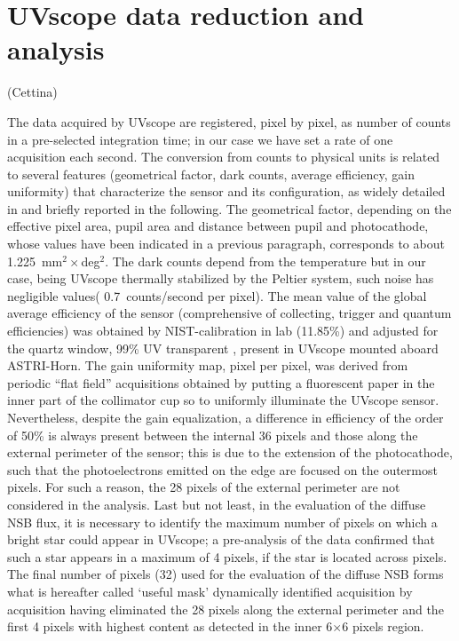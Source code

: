 \newpage
\section{UVscope data reduction and analysis} (Cettina)
\label{sect:uvscopedata}

The data acquired by UVscope are registered, pixel by pixel, as number of counts in a pre-selected integration time; in our case we have set a rate of one acquisition each second. The conversion from counts to physical units is related to several features (geometrical factor, dark counts, average efficiency, gain uniformity) that characterize the sensor and its configuration, as widely detailed in \citep{Maccarone2020} and briefly reported in the following.  The geometrical factor, depending on the effective pixel area, pupil area and distance between pupil and photocathode, whose values have been indicated in a previous paragraph, corresponds to about 1.225~mm$^2{\times}$deg$^2$. The dark counts depend from the temperature but in our case, being UVscope thermally stabilized by the Peltier system, such noise has negligible values( 0.7~counts/second per pixel). The mean value of the global average efficiency of the sensor (comprehensive of collecting, trigger and quantum efficiencies) was obtained by NIST-calibration in lab (11.85\%) and adjusted for the quartz window, 99\% UV transparent , present in UVscope mounted aboard ASTRI-Horn. The gain uniformity map, pixel per pixel, was derived from periodic “flat field” acquisitions obtained by putting a fluorescent paper in the inner part of the collimator cup so to uniformly illuminate the UVscope sensor. Nevertheless, despite the gain equalization, a difference in efficiency of the order of 50\% is always present between the internal 36 pixels and those along the external perimeter of the sensor; this is due to the extension of the photocathode, such that the photoelectrons emitted on the edge are focused on the outermost pixels. For such a reason, the 28 pixels of the external perimeter are not considered in the analysis. Last but not least, in the evaluation of the diffuse NSB flux, it is necessary to identify the maximum number of pixels on which a bright star could appear in UVscope; a pre-analysis of the data confirmed that such a star appears in a maximum of 4 pixels, if the star is located across pixels. The final number of pixels (32) used for the evaluation of the diffuse NSB forms what is hereafter called ‘useful mask’ dynamically identified acquisition by acquisition having eliminated the 28 pixels along the external perimeter and the first 4 pixels with highest content as detected in the inner 6$\times$6 pixels region.

